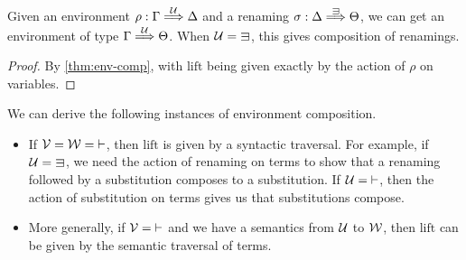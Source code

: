 \begin{corollary}\label{thm:env-postren}
  Given an environment $\rho : \Gamma \stackrel{\mathcal U}\Longrightarrow \Delta$ and a renaming
  $\sigma : \Delta \env\sqni \Theta$, we can get an environment of type
  $\Gamma \stackrel{\mathcal U}\Longrightarrow \Theta$.
  When $\U = {\sqni}$, this gives composition of renamings.
\end{corollary}
\begin{proof}
  By \cref{thm:env-comp}, with $\mathrm{lift}$ being given exactly by the
  action of $\rho$ on variables.
\end{proof}

\begin{example}
  We can derive the following instances of environment composition.
  \begin{itemize}
    \item If $\mathcal V = \mathcal W = {\vdash}$, then $\mathrm{lift}$ is given by a
      syntactic traversal.
      For example, if $\U = {\sqni}$, we need the action of renaming on terms
      to show that a renaming followed by a substitution composes to a
      substitution.
      If $\mathcal U = {\vdash}$, then the action of substitution on terms gives us that
      substitutions compose.
    \item More generally, if $\mathcal V = {\vdash}$ and we have a semantics from
      $\mathcal U$ to $\mathcal W$, then $\mathrm{lift}$ can be given by the semantic traversal
      of terms.
  \end{itemize}
\end{example}
